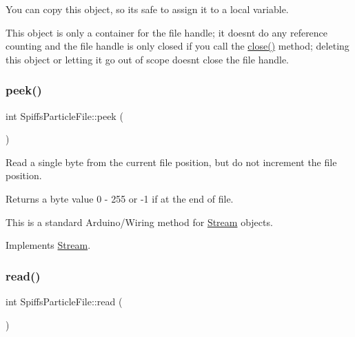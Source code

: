 You can copy this object, so it\textquotesingle{}s safe to assign it to a local variable. 

This object is only a container for the file handle; it doesn\textquotesingle{}t do any reference counting and the file handle is only closed if you call the \mbox{\hyperlink{class_spiffs_particle_file_a0dd9ea24f86d4639ed83e24101968298}{close()}} method; deleting this object or letting it go out of scope doesn\textquotesingle{}t close the file handle. \mbox{\label{class_spiffs_particle_file_a2d6135f557d39fa6229aea72f8aab855}} 
\subsubsection{\texorpdfstring{peek()}{peek()}}
{\footnotesize\ttfamily int Spiffs\+Particle\+File\+::peek (\begin{DoxyParamCaption}{ }\end{DoxyParamCaption})\hspace{0.3cm}{\ttfamily [virtual]}}



Read a single byte from the current file position, but do not increment the file position. 

\begin{DoxyReturn}{Returns}
a byte value 0 -\/ 255 or -\/1 if at the end of file.
\end{DoxyReturn}
This is a standard Arduino/\+Wiring method for \mbox{\hyperlink{class_stream}{Stream}} objects. 

Implements \mbox{\hyperlink{class_stream_a30c3c212ec6ea67277a708c5ea2501a5}{Stream}}.

\mbox{\label{class_spiffs_particle_file_a00ff81c014bb8373b3031e4b6ea48c16}} 
\subsubsection{\texorpdfstring{read()}{read()}}
{\footnotesize\ttfamily int Spiffs\+Particle\+File\+::read (\begin{DoxyParamCaption}{ }\end{DoxyParamCaption})\hspace{0.3cm}{\ttfamily [virtual]}}



